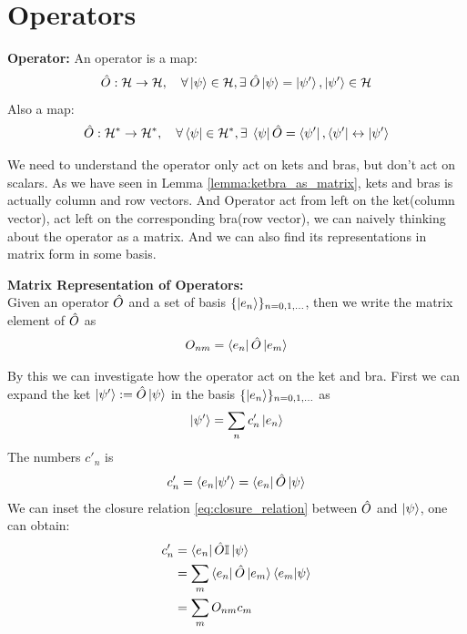 \section{Operators}
\begin{definition}{\textbf{Operator:}}
    An operator is a map:
    \begin{eqnarray}
        \hat{O}: \mathcal{H} \rightarrow \mathcal{H}, \quad \forall \ket{\psi} \in  \mathcal{H}, \exists \;\hat{O}\ket{\psi} = \ket{\psi'}, \ket{\psi'} \in \mathcal{H}
    \end{eqnarray}
    Also a map:
    \begin{eqnarray}
        \hat{O} :\mathcal{H}^* \rightarrow \mathcal{H}^*, \quad \forall \bra{\psi} \in \mathcal{H}^*, \exists \; \bra{\psi} \hat{O} = \bra{\psi'}, \bra{\psi'} \leftrightarrow \ket{\psi'}
    \end{eqnarray}
\end{definition}
We need to understand the operator only act on kets and bras, but don't act on scalars. As we have seen in Lemma \ref{lemma:ketbra_as_matrix}, kets and bras is actually column and row vectors. And Operator act from left on the ket(column vector), act left on the corresponding bra(row vector), we can naively thinking about the operator as a matrix. And we can also find its representations in matrix form in some basis.
\begin{definition}{\textbf{Matrix Representation of Operators:}} \label{def:matrix_operator}
    \\
    Given an operator $\hat{O}$ and a set of basis $\{\ket{e_n}\}_{n=0,1,\dots}$, then we write the matrix element of $\hat{O}$ as 
    \begin{eqnarray}
        O_{nm} = \bra{e_n} \hat{O} \ket{e_m}
    \end{eqnarray}
\end{definition}
By this we can investigate how the operator act on the ket and bra. First we can expand the ket $\ket{\psi'} := \hat{O} \ket{\psi}$ in the basis $\{\ket{e_n}\}_{n=0,1,\dots}$ as
\begin{eqnarray}
    \ket{\psi'} = \sum_{n} c'_n \ket{e_n}
\end{eqnarray}
The numbers $c'_n$ is 
\begin{eqnarray}
    c'_n = \braket{e_n| \psi'} = \bra{e_n} \hat{O} \ket{\psi}
\end{eqnarray}
We can inset the closure relation \cref{eq:closure_relation} between $\hat{O}$ and $\ket{\psi}$, one can obtain: 
\begin{align*}
    c'_n &= \bra{e_n} \hat{O} \mathbb{I} \ket{\psi} \\
    &= \sum_m \bra{e_n} \hat{O} \ket{e_m} \braket{e_m|\psi}\\
    &= \sum_m O_{nm} c_m
\end{align*}

